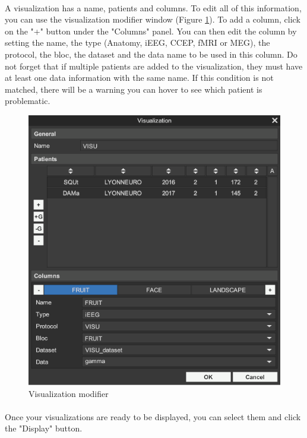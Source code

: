 \documentclass[a4paper]{article}
\begin{document}
\paragraph{} A visualization has a name, patients and columns. To edit all of this information, you can use the visualization modifier window (Figure \ref{visuModifierUI}). To add a column, click on the "+" button under the "Columns" panel. You can then edit the column by setting the name, the type (Anatomy, iEEG, CCEP, fMRI or MEG), the protocol, the bloc, the dataset and the data name to be used in this column. Do not forget that if multiple patients are added to the visualization, they must have at least one data information with the same name. If this condition is not matched, there will be a warning you can hover to see which patient is problematic.
\begin{figure}[H]
\begin{center}
\includegraphics[scale=0.4]{VisualizationModifier.png}
\end{center}
\caption{\label{visuModifierUI}Visualization modifier}
\end{figure}
\paragraph{} Once your visualizations are ready to be displayed, you can select them and click the "Display" button.
\end{document}
